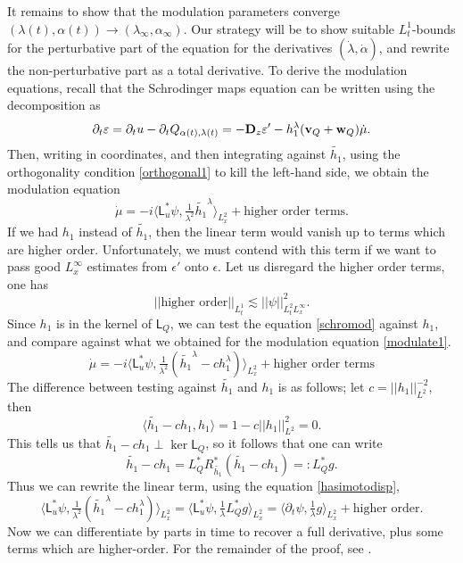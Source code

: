 
It remains to show that the modulation parameters converge $(\lambda(t), \alpha(t)) \to (\lambda_\infty, \alpha_\infty)$. Our strategy will be to show suitable $L^1_t$-bounds for the perturbative part of the equation for the derivatives $(\dot{\lambda}, \dot{\alpha})$, and rewrite the non-perturbative part as a total derivative. To derive the modulation equations, recall that the Schrodinger maps equation can be written using the decomposition as 
    \begin{equation}\label{eq:schromod}
        \partial_t \varepsilon 
            = \partial_t u - \partial_t Q_{\alpha(t), \lambda(t)} = -{\bf D}_z \varepsilon' - h_1^\lambda (\mathbf v_Q + \mathbf w_Q) \dot{\mu}. 
    \end{equation}
Then, writing in coordinates, and then integrating against $\widetilde{h_1}$, using the orthogonality condition \eqref{orthogonal1} to kill the left-hand side, we obtain the modulation equation 
    \begin{equation}\label{eq:modulate1}
        \dot{\mu} 
            = - i \big\langle \mathsf L_u^* \psi, \tfrac{1}{\lambda^2} \widetilde{h_1}^\lambda \big\rangle_{L^2_x} + \text{higher order terms}.
    \end{equation}
If we had $h_1$ instead of $\widetilde{h_1}$, then the linear term would vanish up to terms which are higher order. Unfortunately, we must contend with this term if we want to pass good $L^\infty_x$ estimates from $\epsilon'$ onto $\epsilon$. Let us disregard the higher order terms, one has 
    \[
        ||\text{higher order} ||_{L^1_t} \lesssim ||\psi||_{L^2_t L^\infty_x}^2.
    \]
Since $h_1$ is in the kernel of $\mathsf L_Q$, we can test the equation \eqref{schromod} against $h_1$, and compare against what we obtained for the modulation equation \eqref{modulate1}. 
    \[
        \dot{\mu} 
            =- i \big\langle \mathsf L_u^* \psi, \tfrac{1}{\lambda^2} (\widetilde{h_1}^\lambda - c h_1^\lambda) \big\rangle_{L^2_x} + \text{higher order terms}
    \]
The difference between testing against $\widetilde{h_1}$ and $h_1$ is as follows; let $c = ||h_1||_{L^2}^{-2}$, then 
    \[
        \langle \widetilde{h_1} - c h_1, h_1 \rangle = 1 - c ||h_1||_{L^2}^2 = 0. 
    \]
This tells us that $\widetilde{h_1} - c h_1 \perp \ker \mathsf L_Q$, so it follows that one can write 
    \[
        \widetilde{h_1} - c h_1 = L^*_Q R^*_{\widetilde{h_1}} (\widetilde{h_1} - c h_1) =: L_Q^* g . 
    \]
Thus we can rewrite the linear term, using the equation \eqref{hasimotodisp},
    \[
        \big\langle \mathsf L_u^* \psi, \tfrac{1}{\lambda^2} (\widetilde{h_1}^\lambda - c h_1^\lambda) \big\rangle_{L^2_x} = \big\langle \mathsf L_u^* \psi, \tfrac{1}{\lambda} L_Q^* g \big\rangle_{L^2_x} = \big\langle \partial_t \psi, \tfrac{1}{\lambda} g \big\rangle_{L^2_x} + \text{higher order}. 
    \]
Now we can differentiate by parts in time to recover a full derivative, plus some terms which are higher-order. For the remainder of the proof, see \cite[Section 7, 8]{GustafsonEtAl2010}.